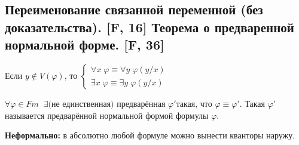 \documentclass[a4paper, fleqn]{article}
\begin{document}
    \subsection{Переименование связанной переменной (без доказательства). [F, 16] Теорема о предваренной нормальной форме. [F, 36]}
    \begin{proposition}

        Если $y \notin V(\varphi)$, то $\begin{cases}
        \forall x \; \varphi \equiv \forall y \; \varphi(y/x) \\
        \exists x \; \varphi \equiv \exists y \; \varphi(y/x)
        \end{cases}$
    \end{proposition}

    \begin{theorem}
        $\forall \varphi \in Fm \;\; \exists \text{(не единственная) предварённая } \varphi' \text{такая, что } \varphi \equiv \varphi'$. Такая $\varphi'$ называется предварённой нормальной формой формулы $\varphi$.
    \end{theorem}

    \textbf{Неформально:} в абсолютно любой формуле можно вынести кванторы наружу.
\end{document}
